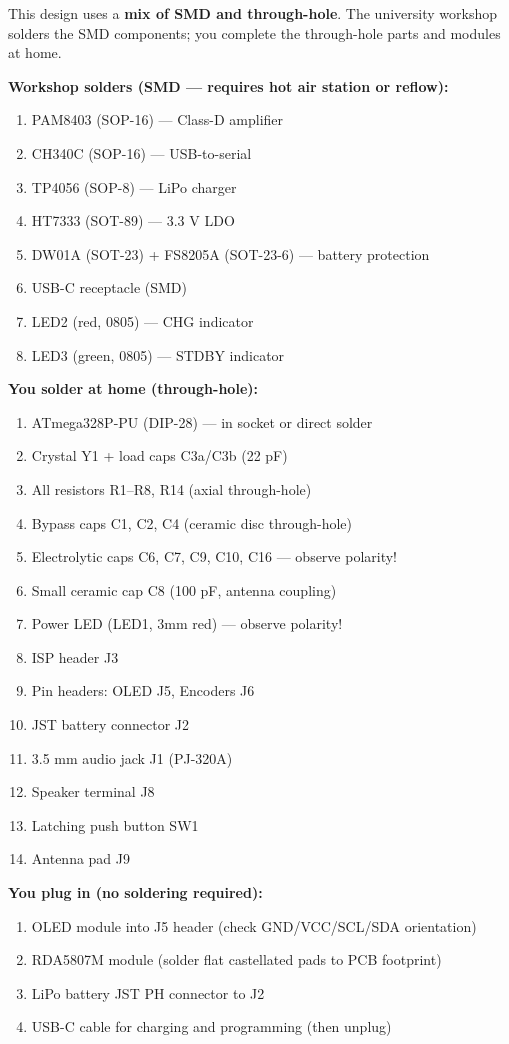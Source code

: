 \documentclass[a4paper,11pt]{article}
\renewcommand*{\,}{ }%
\begin{document}
This design uses a \textbf{mix of SMD and through-hole}. The university workshop solders the SMD components; you complete the through-hole parts and modules at home.

\textbf{Workshop solders (SMD --- requires hot air station or reflow):}
\begin{enumerate}[noitemsep]
    \item PAM8403 (SOP-16) --- Class-D amplifier
    \item CH340C (SOP-16) --- USB-to-serial
    \item TP4056 (SOP-8) --- LiPo charger
    \item HT7333 (SOT-89) --- 3.3\,V LDO
    \item DW01A (SOT-23) + FS8205A (SOT-23-6) --- battery protection
    \item USB-C receptacle (SMD)
    \item LED2 (red, 0805) --- CHG indicator
    \item LED3 (green, 0805) --- STDBY indicator
\end{enumerate}

\textbf{You solder at home (through-hole):}
\begin{enumerate}[noitemsep]
    \item ATmega328P-PU (DIP-28) --- in socket or direct solder
    \item Crystal Y1 + load caps C3a/C3b (22\,pF)
    \item All resistors R1--R8, R14 (axial through-hole)
    \item Bypass caps C1, C2, C4 (ceramic disc through-hole)
    \item Electrolytic caps C6, C7, C9, C10, C16 --- observe polarity!
    \item Small ceramic cap C8 (100\,pF, antenna coupling)
    \item Power LED (LED1, 3mm red) --- observe polarity!
    \item ISP header J3
    \item Pin headers: OLED J5, Encoders J6
    \item JST battery connector J2
    \item 3.5\,mm audio jack J1 (PJ-320A)
    \item Speaker terminal J8
    \item Latching push button SW1
    \item Antenna pad J9
\end{enumerate}

\textbf{You plug in (no soldering required):}
\begin{enumerate}[noitemsep]
    \item OLED module into J5 header (check GND/VCC/SCL/SDA orientation)
    \item RDA5807M module (solder flat castellated pads to PCB footprint)
    \item LiPo battery JST PH connector to J2
    \item USB-C cable for charging and programming (then unplug)
\end{enumerate}
\end{document}
